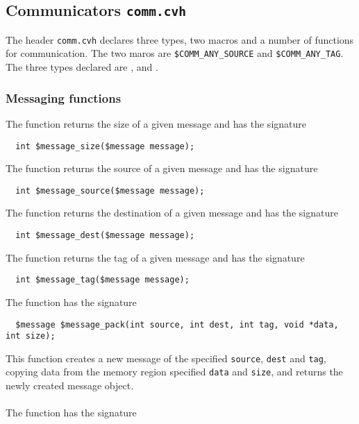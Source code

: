 \subsection{Communicators \texttt{comm.cvh}}
\label{subsec:commLibrary}

The header \texttt{comm.cvh} declares three types, two macros and a number of functions for communication. The two maros are \texttt{\$COMM\_ANY\_SOURCE} and \texttt{\$COMM\_ANY\_TAG}. The three types declared are \cmessage, \cgcomm{} and \ccomm. 

\subsubsection{Messaging functions}
\label{subsubsec:messaging}

The function \cmessagesize{} returns the size of a given message and has the signature

\begin{verbatim}
  int $message_size($message message);
\end{verbatim}

\noindent The function \cmessagesource{} returns the source of a given message and has the signature

\begin{verbatim}
  int $message_source($message message);
\end{verbatim}

\noindent The function \cmessagedest{} returns the destination of a given message and has the signature

\begin{verbatim}
  int $message_dest($message message);
\end{verbatim}

\noindent The function \cmessagetag{} returns the tag of a given message and has the signature

\begin{verbatim}
  int $message_tag($message message);
\end{verbatim}

\noindent The function \cmessagepack{} has the signature

\begin{verbatim}
  $message $message_pack(int source, int dest, int tag, void *data, int size);
\end{verbatim}

This function creates a new message of the specified \texttt{source}, \texttt{dest} and \texttt{tag}, copying data from the memory region specified \texttt{data} and \texttt{size}, and returns the newly created message object.
\\~\\
\noindent The function \cmessageunpack{} has the signature

